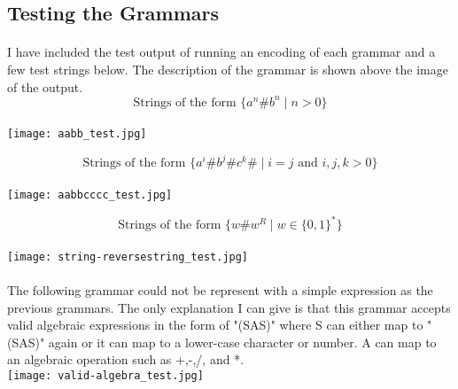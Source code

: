 \documentclass[11pt]{article}
\begin{document}
\subsection*{Testing the Grammars}
\paragraph{}I have included the test output of running an encoding of each grammar and a few test strings below. The description of the grammar is shown above the image of the output.
\[\text{Strings of the form } \{ a^n\#b^n \;|\; n > 0 \} \]
\\
\texttt{[image: aabb\_test.jpg]}

\[\text{Strings of the form } \{ a^i\#b^j\#c^k\# \;|\; i = j \text{ and } i,j,k > 0 \} \]
\\
\texttt{[image: aabbcccc\_test.jpg]}

 \[\text{Strings of the form } \{ w\#w^R \;|\; w \in \{0,1\}^* \} \]
\\
\texttt{[image: string-reversestring\_test.jpg]}
\\
\paragraph{} The following grammar could not be represent with a simple expression as the previous grammars. The only explanation I can give is that this grammar accepts valid algebraic expressions in the form of "(SAS)" where S can either map to "(SAS)" again or it can map to a lower-case character or number. A can map to an algebraic operation such as +,-,/, and *.
\\
\texttt{[image: valid-algebra\_test.jpg]}

\vspace{25mm}
\end{document}
